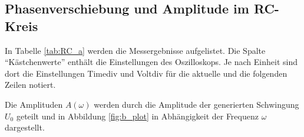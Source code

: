 \subsection{Phasenverschiebung und Amplitude im RC-Kreis}
In Tabelle \ref{tab:RC_a} werden die Messergebnisse aufgelistet. 
Die Spalte \enquote{Kästchenwerte} enthält die Einstellungen des Oszilloskops.
Je nach Einheit sind dort die Einstellungen Timediv und Voltdiv für die aktuelle und die folgenden Zeilen notiert.
%

%
Die Amplituden $A(\omega)$ werden durch die Amplitude der generierten Schwingung $U_0$ geteilt und in Abbildung \ref{fig:b_plot}
in Abhängigkeit der Frequenz $\omega$ dargestellt.




